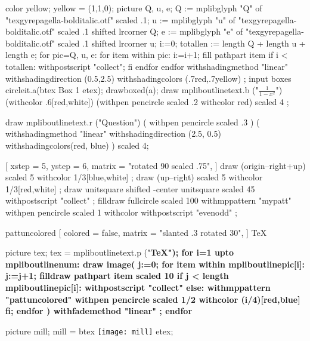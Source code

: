 \documentclass{article}
\begin{document}
\leavevmode
\mpfig
color yellow; yellow = (1,1,0);
picture Q, u, e;
Q := mplibglyph "Q" of "texgyrepagella-bolditalic.otf" scaled .1;
u := mplibglyph "u" of "texgyrepagella-bolditalic.otf" scaled .1 shifted lrcorner Q;
e := mplibglyph "e" of "texgyrepagella-bolditalic.otf" scaled .1 shifted lrcorner u;
i:=0;
totallen := length Q + length u + length e;
for pic=Q, u, e:
  for item within pic:
    i:=i+1;
    fill pathpart item
    if i < totallen: withpostscript "collect"; fi
  endfor
endfor
  withshadingmethod "linear"
  withshadingdirection (0.5,2.5)
  withshadingcolors (.7red,.7yellow)
  ;
\endmpfig
{}%
\mpfig* input boxes \endmpfig
\mpfig circleit.a(btex Box 1 etex); drawboxed(a); \endmpfig
\def\mpfiginstancename{mympfig}%
\mpfig
draw mpliboutlinetext.b ("$\displaystyle\frac{1}{1-x^2}$")
    (withcolor .6[red,white])
    (withpen pencircle scaled .2 withcolor red)
    scaled 4 ;
\endmpfig
\par
\mpfig
  draw mpliboutlinetext.r
    ("Question")
    ( withpen pencircle scaled .3 )
    (
      withshadingmethod "linear"
      withshadingdirection (2.5, 0.5)
      withshadingcolors(red, blue)
    )
    scaled 4;
\endmpfig
\par\leavevmode
{}
[
  xstep = 5, ystep = 6,
  matrix = "rotated 90 scaled .75",
]
\mpfig
draw (origin--right+up) scaled 5 withcolor 1/3[blue,white] ;
draw (up--right) scaled 5 withcolor 1/3[red,white] ;
\endmpfig
\endmppattern
\mpfig
draw unitsquare shifted -center unitsquare scaled 45 withpostscript "collect" ;
filldraw fullcircle scaled 100 withmppattern "mypatt" withpen pencircle scaled 1
  withcolor  withpostscript "evenodd" ;
\endmpfig
\begin{mppattern}{pattuncolored}
  [
    colored = false,
    matrix = "slanted .3 rotated 30",
  ]
  \tiny\TeX
\end{mppattern}\relax
\mpfig
  picture tex;
  tex = mpliboutlinetext.p ("\bfseries \TeX");
  for i=1 upto mpliboutlinenum:
    draw image(
    j:=0;
    for item within mpliboutlinepic[i]:
      j:=j+1;
      filldraw pathpart item scaled 10
      if j < length mpliboutlinepic[i]:
          withpostscript "collect"
      else:
          withmppattern "pattuncolored"
          withpen pencircle scaled 1/2
          withcolor (i/4)[red,blue]
      fi;
    endfor
    )
    withfademethod "linear"
    ;
  endfor
\endmpfig
\par\leavevmode
\mpfig
  picture mill; mill = btex \texttt{[image: mill]} etex;
\end{document}
